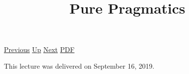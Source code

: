 \documentclass[12pt,a4paper]{report}
\begin{document}
 \href{doc/phil/People/Brandom/OnSellars/2019/NominalismII.html}{Previous} 
 \href{doc/phil/People/Brandom/OnSellars/2019.html}{Up} 
 \href{doc/phil/People/Brandom/OnSellars/2019/ScientificRealism.html}{Next} 
 \href{doc/phil/People/Brandom/OnSellars/2019/PurePragmatics.pdf}{PDF} 
\title{Pure Pragmatics}

\tableofcontents
This lecture was delivered on September 16, 2019.
\end{document}
